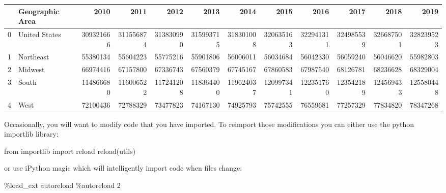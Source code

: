 \documentclass[
  letterpaper,
  DIV=11,
  numbers=noendperiod]{scrreprt}
\newenvironment{Shaded}{\begin{snugshade}}{\end{snugshade}}
\newcommand{\BuiltInTok}[1]{\textcolor[rgb]{0.00,0.23,0.31}{#1}}
\newcommand{\DecValTok}[1]{\textcolor[rgb]{0.68,0.00,0.00}{#1}}
\newcommand{\ImportTok}[1]{\textcolor[rgb]{0.00,0.46,0.62}{#1}}
\newcommand{\NormalTok}[1]{\textcolor[rgb]{0.00,0.23,0.31}{#1}}
\newcommand{\OperatorTok}[1]{\textcolor[rgb]{0.37,0.37,0.37}{#1}}
\begin{document}
\begin{tabular}{llrrrrrrrrrr}
\toprule
{} & Geographic Area &       2010 &       2011 &       2012 &       2013 &       2014 &       2015 &       2016 &       2017 &       2018 &       2019 \\
\midrule
0 &   United States &  309321666 &  311556874 &  313830990 &  315993715 &  318301008 &  320635163 &  322941311 &  324985539 &  326687501 &  328239523 \\
1 &       Northeast &   55380134 &   55604223 &   55775216 &   55901806 &   56006011 &   56034684 &   56042330 &   56059240 &   56046620 &   55982803 \\
2 &         Midwest &   66974416 &   67157800 &   67336743 &   67560379 &   67745167 &   67860583 &   67987540 &   68126781 &   68236628 &   68329004 \\
3 &           South &  114866680 &  116006522 &  117241208 &  118364400 &  119624037 &  120997341 &  122351760 &  123542189 &  124569433 &  125580448 \\
4 &            West &   72100436 &   72788329 &   73477823 &   74167130 &   74925793 &   75742555 &   76559681 &   77257329 &   77834820 &   78347268 \\
\bottomrule
\end{tabular}

Occasionally, you will want to modify code that you have imported. To
reimport those modifications you can either use the python importlib
library:

\begin{Shaded}
\begin{Highlighting}[]
\ImportTok{from}\NormalTok{ importlib }\ImportTok{import} \BuiltInTok{reload}
\BuiltInTok{reload}\NormalTok{(utils)}
\end{Highlighting}
\end{Shaded}

or use iPython magic which will intelligently import code when files
change:

\begin{Shaded}
\begin{Highlighting}[]
\OperatorTok{\%}\NormalTok{load\_ext autoreload}
\OperatorTok{\%}\NormalTok{autoreload }\DecValTok{2}
\end{Highlighting}
\end{Shaded}
\end{document}

